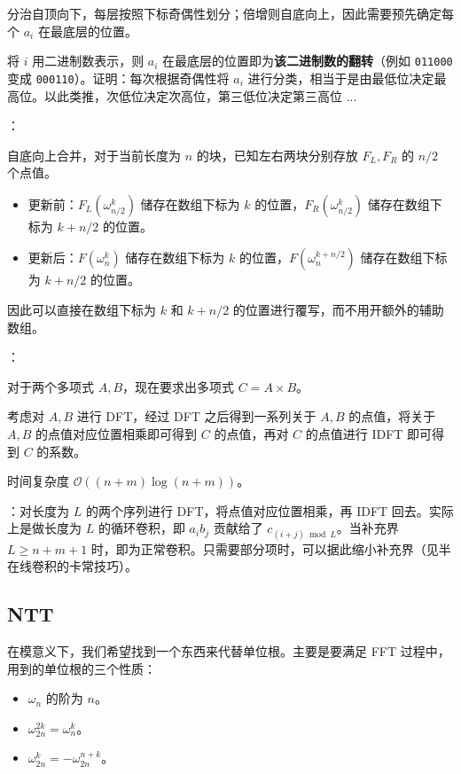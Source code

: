 分治自顶向下，每层按照下标奇偶性划分；倍增则自底向上，因此需要预先确定每个 $a_i$ 在最底层的位置。

将 $i$ 用二进制数表示，则 $a_i$ 在最底层的位置即为\textbf{该二进制数的翻转}（例如 \texttt{011000} 变成 \texttt{000110}）。证明：每次根据奇偶性将 $a_i$ 进行分类，相当于是由最低位决定最高位。以此类推，次低位决定次高位，第三低位决定第三高位 ...

：

自底向上合并，对于当前长度为 $n$ 的块，已知左右两块分别存放 $F_L, F_R$ 的 $n / 2$ 个点值。
\begin{itemize}
    \item 更新前：$F_L(\omega_{n / 2}^k)$ 储存在数组下标为 $k$ 的位置，$F_R(\omega_{n / 2}^k)$ 储存在数组下标为 $k + n / 2$ 的位置。
    \item 更新后：$F(\omega_n^k)$ 储存在数组下标为 $k$ 的位置，$F(\omega_n^{k + n / 2})$ 储存在数组下标为 $k + n / 2$ 的位置。
\end{itemize}

因此可以直接在数组下标为 $k$ 和 $k + n / 2$ 的位置进行覆写，而不用开额外的辅助数组。

：

对于两个多项式 $A, B$，现在要求出多项式 $C = A \times B$。

考虑对 $A, B$ 进行 DFT，经过 DFT 之后得到一系列关于 $A, B$ 的点值，将关于 $A, B$ 的点值对应位置相乘即可得到 $C$ 的点值，再对 $C$ 的点值进行 IDFT 即可得到 $C$ 的系数。

时间复杂度 $\mathcal{O}((n + m) \log (n + m))$。

：对长度为 $L$ 的两个序列进行 DFT，将点值对应位置相乘，再 IDFT 回去。实际上是做长度为 $L$ 的循环卷积，即 $a_ib_j$ 贡献给了 $c_{(i + j) \bmod L}$。当补充界 $L \geq n + m + 1$ 时，即为正常卷积。只需要部分项时，可以据此缩小补充界（见半在线卷积的卡常技巧）。


\subsection{NTT}

在模意义下，我们希望找到一个东西来代替单位根。主要是要满足 FFT 过程中，用到的单位根的三个性质：

\begin{itemize}
    \item $\omega_n$ 的阶为 $n$。
    \item $\omega_{2n}^{2k} = \omega_n^k$。
    \item $\omega_{2n}^k = -\omega_{2n}^{n + k}$。
\end{itemize}

